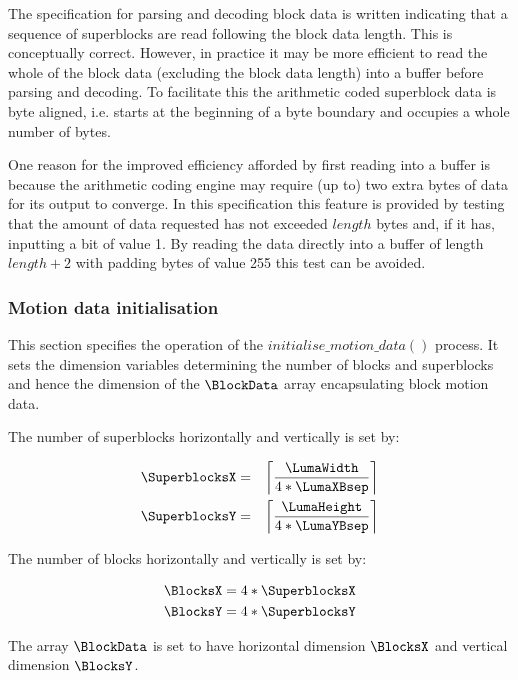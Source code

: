\begin{informative}
The specification for parsing and decoding block data is written indicating that a sequence of 
superblocks are read following the block data length. This is conceptually correct. However, 
in practice it may be more efficient to read the whole of the block data (excluding the block 
data length) into a buffer before parsing and decoding. To facilitate this the arithmetic coded 
superblock data is byte aligned, i.e. starts at the beginning of a byte boundary and occupies a 
whole number of bytes.

One reason for the improved efficiency afforded by first reading into a buffer is because the 
arithmetic coding engine may require (up to) two extra bytes of data for its output to 
converge. In this specification this feature is provided by testing that the amount of data 
requested has not exceeded $length$ bytes and, if it has, inputting a bit of value 1. By 
reading the data directly into a buffer of length  $length + 2$ with padding bytes of value 255 this test can be 
avoided.
\end{informative}

\subsubsection{Motion data initialisation}

\label{motioninit}

This section specifies the operation of the $initialise\_motion\_data()$ process. It sets the dimension variables determining the
number of blocks and superblocks and hence the dimension of the $\BlockData$ array encapsulating block motion
data.

The number of superblocks horizontally and vertically is set by:

\begin{eqnarray*}
\SuperblocksX & = & \left\lceil \frac{\LumaWidth}{4*\LumaXBsep} \right\rceil  \\
\SuperblocksY & = & \left\lceil \frac{\LumaHeight}{4*\LumaYBsep} \right\rceil 
\end{eqnarray*}

The number of blocks horizontally and vertically is set by:

\begin{eqnarray*}
\BlocksX = 4*\SuperblocksX \\
\BlocksY = 4*\SuperblocksY
\end{eqnarray*}

The array $\BlockData$ is set to have horizontal dimension $\BlocksX$ and vertical dimension $\BlocksY$.

